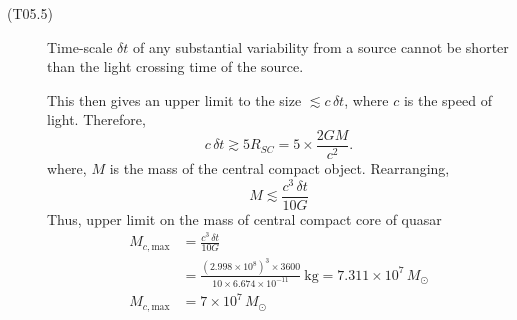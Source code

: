 \begin{description}
\item[(T05.5)] Time-scale $\delta t$ of any substantial variability from a
  source cannot be shorter than the light crossing time of the source.

  This then gives an upper limit to the size $\lesssim c\,\delta t$, where $c$
  is the speed of light. Therefore,
  \begin{equation*}
  c\,\delta t \gtrsim 5 R_{SC} = 5 \times \frac{2GM}{c^2}.
  \tag*{(1.0)}
  \end{equation*}
  where, $M$ is the mass of the central compact object. Rearranging,
  \[
  M \lesssim \frac{c^3\,\delta t}{10G}
  \]
  Thus, upper limit on the mass of central compact core of quasar
  \begin{align*}
  M_{c,\mathrm{max}} &= \frac{c^3\,\delta t}{10G}
  \tag*{(1.0)} \\
  &= \frac{(2.998 \times 10^{8})^3 \times 3600}
          {10 \times 6.674 \times 10^{-11}}~\mathrm{kg}
   = 7.311 \times 10^{7}\,M_\odot \\
  M_{c,\mathrm{max}} &= 7 \times 10^{7}\,M_\odot
  \tag*{(1.0)}
  \end{align*}
\end{description}


